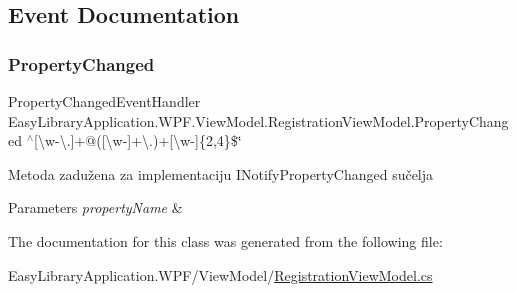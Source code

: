 \subsection{Event Documentation}
\mbox{\label{class_easy_library_application_1_1_w_p_f_1_1_view_model_1_1_registration_view_model_ae88942054c90a4f0f9a66c39166d11e6}} 
\subsubsection{\texorpdfstring{Property\+Changed}{PropertyChanged}}
{\footnotesize\ttfamily Property\+Changed\+Event\+Handler Easy\+Library\+Application.\+W\+P\+F.\+View\+Model.\+Registration\+View\+Model.\+Property\+Changed $^\wedge$\mbox{[}\textbackslash{}w-\/\textbackslash{}.\mbox{]}+@(\mbox{[}\textbackslash{}w-\/\mbox{]}+\textbackslash{}.)+\mbox{[}\textbackslash{}w-\/\mbox{]}\{2,4\}\$\char`\"{}}



Metoda zadužena za implementaciju I\+Notify\+Property\+Changed sučelja 


\begin{DoxyParams}{Parameters}
{\em property\+Name} & \\
\hline
\end{DoxyParams}


The documentation for this class was generated from the following file\+:\begin{DoxyCompactItemize}
\item 
Easy\+Library\+Application.\+W\+P\+F/\+View\+Model/\mbox{\hyperlink{_registration_view_model_8cs}{Registration\+View\+Model.\+cs}}\end{DoxyCompactItemize}
